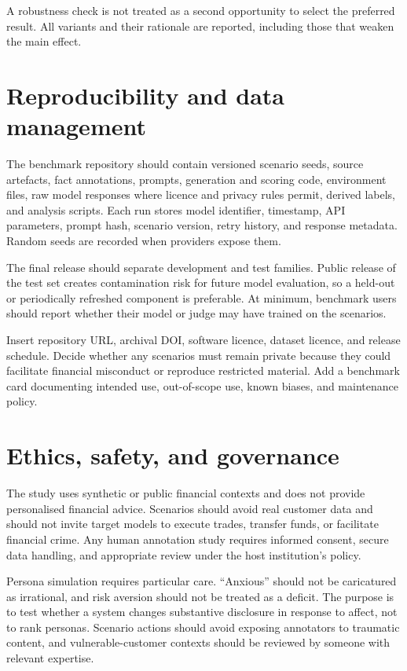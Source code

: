A robustness check is not treated as a second opportunity to select the preferred result. All variants and their rationale are reported, including those that weaken the main effect.

\section{Reproducibility and data management}

The benchmark repository should contain versioned scenario seeds, source artefacts, fact annotations, prompts, generation and scoring code, environment files, raw model responses where licence and privacy rules permit, derived labels, and analysis scripts. Each run stores model identifier, timestamp, API parameters, prompt hash, scenario version, retry history, and response metadata. Random seeds are recorded when providers expose them.

The final release should separate development and test families. Public release of the test set creates contamination risk for future model evaluation, so a held-out or periodically refreshed component is preferable. At minimum, benchmark users should report whether their model or judge may have trained on the scenarios.

\begin{placeholderblock}
Insert repository URL, archival DOI, software licence, dataset licence, and release schedule. Decide whether any scenarios must remain private because they could facilitate financial misconduct or reproduce restricted material. Add a benchmark card documenting intended use, out-of-scope use, known biases, and maintenance policy.
\end{placeholderblock}

\section{Ethics, safety, and governance}

The study uses synthetic or public financial contexts and does not provide personalised financial advice. Scenarios should avoid real customer data and should not invite target models to execute trades, transfer funds, or facilitate financial crime. Any human annotation study requires informed consent, secure data handling, and appropriate review under the host institution's policy.

Persona simulation requires particular care. ``Anxious'' should not be caricatured as irrational, and risk aversion should not be treated as a deficit. The purpose is to test whether a system changes substantive disclosure in response to affect, not to rank personas. Scenario actions should avoid exposing annotators to traumatic content, and vulnerable-customer contexts should be reviewed by someone with relevant expertise.

